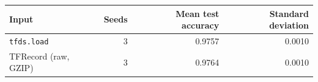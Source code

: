 \begin{tabular}{lrrr}
\toprule
Input & Seeds & Mean test accuracy & Standard deviation \\
\midrule
\texttt{tfds.load} & 3 & 0.9757 & 0.0010 \\
TFRecord (raw, GZIP) & 3 & 0.9764 & 0.0010 \\
\bottomrule
\end{tabular}
